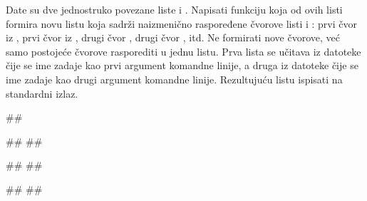 \begin{Exercise}[label=610]
Date su dve jednostruko povezane liste  i . Napisati funkciju koja od 
ovih listi formira novu listu  koja sadrži naizmenično raspoređene čvorove 
listi  i : prvi čvor iz , prvi čvor iz , drugi čvor ,
drugi čvor , itd. Ne formirati nove čvorove, već samo postojeće čvorove 
rasporediti u jednu listu. Prva lista se učitava iz datoteke čije se ime zadaje kao prvi argument komandne linije, a druga iz datoteke čije se ime zadaje kao 
drugi argument komandne linije. Rezultujuću listu ispisati na standardni izlaz. 


\noindent
\begin{miditest}
\begin{test}{1}
##

##
##

##
##

#\naslovIzlaz#
##
\end{test}
\end{miditest}
\end{Exercise}

